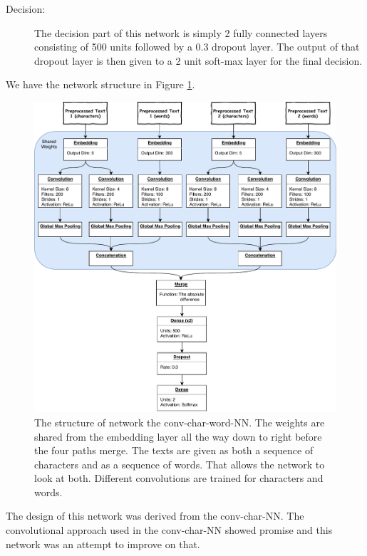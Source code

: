 \begin{description}
    \item[Decision:]

        The decision part of this network is simply 2 fully connected layers
        consisting of 500 units followed by a 0.3 dropout layer. The output of
        that dropout layer is then given to a 2 unit soft-max layer for the
        final decision.

\end{description}

We have the network structure in Figure \ref{fig:conv-char-NN-model}.

\begin{figure}
    \centering
    \includegraphics[width=\textwidth]{./pictures/experiments/conv_char_word_nn/model}
    \caption{The structure of network the \gls{conv-char-word-NN}. The weights are
        shared from the embedding layer all the way down to right before
        the four paths merge. The texts are given as both a sequence of
        characters and as a sequence of words. That allows the network to look
        at both. Different convolutions are trained for characters and words.}
    \label{fig:conv-char-NN-model}
\end{figure}

The design of this network was derived from the \gls{conv-char-NN}. The
convolutional approach used in the \gls{conv-char-NN} showed promise and this
network was an attempt to improve on that.

